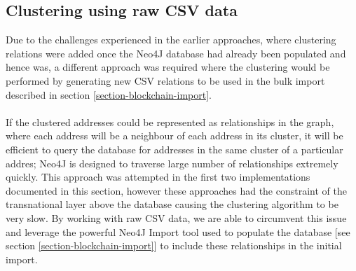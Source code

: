 \subsection{Clustering using raw CSV data}\label{clustering-raw-csv}
Due to the challenges experienced in the earlier approaches, where clustering relations were added once the Neo4J database had already been populated and hence was, a different approach was required where the clustering would be performed by generating new CSV relations to be used in the bulk import described in section \ref{section-blockchain-import}. 
\\\\
If the clustered addresses could be represented as relationships in the graph, where each address will be a neighbour of each address in its cluster, it will be efficient to query the database for addresses in the same cluster of a particular addres;  Neo4J is designed to traverse large number of relationships extremely quickly. This approach was attempted in the first two implementations documented in this section, however these approaches had the constraint of the transnational layer above the database causing the clustering algorithm to be very slow. By working with raw CSV data, we are able to circumvent this issue and leverage the powerful Neo4J Import tool used to populate the database [see section \ref{section-blockchain-import}] to include these relationships in the initial import. 

